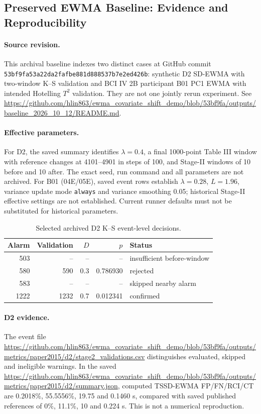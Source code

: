 \subsection{Preserved EWMA Baseline: Evidence and Reproducibility}
\label{sec:ewma_baseline}
\paragraph{Source revision.} This archival baseline indexes two distinct cases at GitHub commit \texttt{53bf9fa53a22da2fafbe881d888537b7e2ed426b}: synthetic D2 SD-EWMA with two-window K--S validation and BCI IV 2B participant B01 PC1 EWMA with intended Hotelling $T^2$ validation. They are not one jointly rerun experiment. See \url{https://github.com/hlin863/ewma_covariate_shift_demo/blob/53bf9fa/outputs/baseline_2026_10_12/README.md}.
\paragraph{Effective parameters.} For D2, the saved summary identifies $\lambda=0.4$, a final 1000-point Table III window with reference changes at 4101--4901 in steps of 100, and Stage-II windows of 10 before and 10 after. The exact seed, run command and all parameters are not archived. For B01 (04E/05E), saved event rows establish $\lambda=0.28$, $L=1.96$, variance update mode \texttt{always} and variance smoothing 0.05; historical Stage-II effective settings are not established. Current runner defaults must not be substituted for historical parameters.
\begin{table}[htbp]\centering\small
\caption{Selected archived D2 K--S event-level decisions.}\label{tab:baseline_d2_events}
\begin{tabular}{rrrrl}\hline Alarm & Validation & $D$ & $p$ & Status \\\hline
503 & -- & -- & -- & insufficient before-window \\
580 & 590 & 0.3 & 0.786930 & rejected \\
583 & -- & -- & -- & skipped nearby alarm \\
1222 & 1232 & 0.7 & 0.012341 & confirmed \\\hline
\end{tabular}\end{table}
\paragraph{D2 evidence.} The event file \url{https://github.com/hlin863/ewma_covariate_shift_demo/blob/53bf9fa/outputs/metrics/paper2015/d2/stage2_validations.csv} distinguishes evaluated, skipped and ineligible warnings. In the saved \url{https://github.com/hlin863/ewma_covariate_shift_demo/blob/53bf9fa/outputs/metrics/paper2015/d2/summary.json}, computed TSSD-EWMA FP/FN/RCI/CT are 0.2018\%, 55.5556\%, 19.75 and 0.1460 s, compared with saved published references of 0\%, 11.1\%, 10 and 0.224 s. This is not a numerical reproduction.
